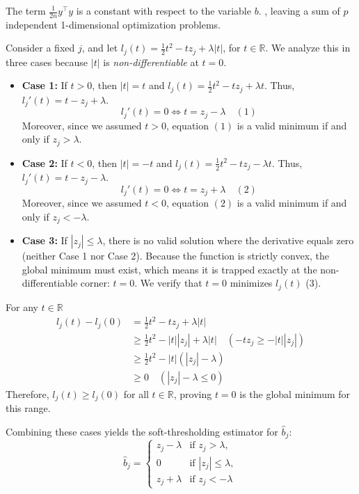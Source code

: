 \documentclass[
  11pt,
]{article}
\begin{document}
The term \(\frac{1}{2n} y^\top y\) is a constant with respect to the
variable \(b\). , leaving a sum of \(p\) independent 1-dimensional
optimization problems.

Consider a fixed \(j\), and let
\(l_j (t) = \frac{1}{2} t^2 - t z_j + \lambda |t|\), for
\(t \in \mathbb{R}\). We analyze this in three cases because \(|t|\) is
\emph{non-differentiable} at \(t=0\).

\begin{itemize}
\item
  \textbf{Case 1:} If \(t > 0\), then \(|t| = t\) and
  \(l_j (t) = \frac{1}{2} t^2 - t z_j + \lambda t\). Thus,
  \(l_j' (t) = t - z_j + \lambda\).
  \[ l_j' (t) = 0 \iff t = z_j - \lambda \quad (1) \] Moreover, since we
  assumed \(t > 0\), equation \((1)\) is a valid minimum if and only if
  \(z_j > \lambda\).
\item
  \textbf{Case 2:} If \(t < 0\), then \(|t| = - t\) and
  \(l_j (t) = \frac{1}{2} t^2 - t z_j - \lambda t\). Thus,
  \(l_j' (t) = t - z_j - \lambda\).
  \[ l_j' (t) = 0 \iff t = z_j + \lambda \quad (2) \] Moreover, since we
  assumed \(t < 0\), equation \((2)\) is a valid minimum if and only if
  \(z_j < -\lambda\).
\item
  \textbf{Case 3:} If \(|z_j| \le \lambda\), there is no valid solution
  where the derivative equals zero (neither Case 1 nor Case 2). Because
  the function is strictly convex, the global minimum must exist, which
  means it is trapped exactly at the non-differentiable corner:
  \(t = 0\). We verify that \(t = 0\) minimizes \(l_j (t)\) (3).
\end{itemize}

For any \(t \in \mathbb{R}\) \[\begin{aligned}
l_j (t) - l_j (0) &= \frac{1}{2} t^2 - t z_j + \lambda |t| \\
                  &\ge \frac{1}{2} t^2 - |t| |z_j| + \lambda |t| \quad (-t z_j \ge -|t| |z_j|) \\
                  &\ge \frac{1}{2} t^2 - |t| (|z_j| - \lambda) \\
                  &\ge 0 \quad (|z_j| - \lambda \le 0)
\end{aligned}\] Therefore, \(l_j (t) \ge l_j (0)\) for all
\(t \in \mathbb{R}\), proving \(t=0\) is the global minimum for this
range.

Combining these cases yields the soft-thresholding estimator for
\(\hat{b}_j\): \[\hat{b}_j = \begin{cases}
  z_j - \lambda & \text{if } z_j > \lambda, \\
  0             & \text{if } |z_j| \le \lambda, \\
  z_j + \lambda & \text{if } z_j < -\lambda
\end{cases}\]
\end{document}
